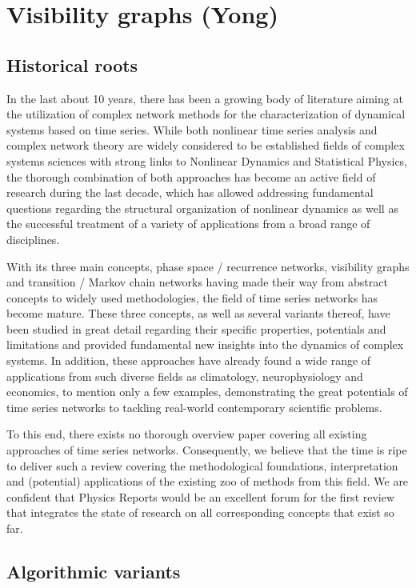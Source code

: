 \section{Visibility graphs {\bf{(Yong)}}}
	\subsection{Historical roots}
In the last about 10 years, there has been a growing body of literature aiming
at the utilization of complex network methods for the characterization of
dynamical systems based on time series. While both nonlinear time series
analysis and complex network theory are widely considered to be established
fields of complex systems sciences with strong links to Nonlinear Dynamics and
Statistical Physics, the thorough combination of both approaches has become an
active field of research during the last decade, which has allowed addressing
fundamental questions regarding the structural organization of nonlinear
dynamics as well as the successful treatment of a variety of applications from a
broad range of disciplines.

With its three main concepts, phase space / recurrence networks, visibility
graphs and transition / Markov chain networks having made their way from
abstract concepts to widely used methodologies, the field of time series
networks has become mature. These three concepts, as well as several variants
thereof, have been studied in great detail regarding their specific properties,
potentials and limitations and provided fundamental new insights into the
dynamics of complex systems. In addition, these approaches have already found a
wide range of applications from such diverse fields as climatology,
neurophysiology and economics, to mention only a few examples, demonstrating the
great potentials of time series networks to tackling real-world contemporary
scientific problems.

To this end, there exists no thorough overview paper covering all existing
approaches of time series networks. Consequently, we believe that the time is
ripe to deliver such a review covering the methodological foundations,
interpretation and (potential) applications of the existing zoo of methods from
this field. We are confident that Physics Reports would be an excellent forum
for the first review that integrates the state of research on all corresponding
concepts that exist so far.

	\subsection{Algorithmic variants}
